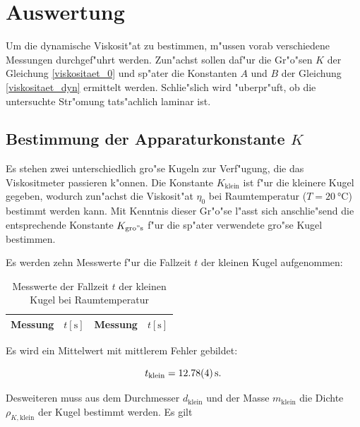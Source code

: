 \clearpage
\newpage
\section{Auswertung}
	\label{sec:auswertung}

	Um die dynamische Viskosit"at zu bestimmen, m"ussen vorab verschiedene Messungen durchgef"uhrt werden.
	Zun"achst sollen daf"ur die Gr"o"sen $K$ der Gleichung \eqref{viskositaet_0} und sp"ater die Konstanten $A$ und $B$ der Gleichung \eqref{viskositaet_dyn} ermittelt werden.
	Schlie"slich wird "uberpr"uft, ob die untersuchte Str"omung tats"achlich laminar ist.

	\subsection{Bestimmung der Apparaturkonstante $K$} %
		\label{sub:bestimmung_k}

		Es stehen zwei unterschiedlich gro"se Kugeln zur Verf"ugung, die das Viskositmeter pas\-sie\-ren k"onnen.
		Die Konstante $K_\mathrm{klein}$ ist f"ur die kleinere Kugel gegeben, wodurch zun"achst die Viskosit"at $\eta_0$ bei Raumtemperatur ($T = \SI{20}{\celsius}$) bestimmt werden kann.
		Mit Kenntnis dieser Gr"o"se l"asst sich anschlie"send die entsprechende Konstante $K_\mathrm{gro"s}$ f"ur die sp"ater ver\-wen\-de\-te gro"se Kugel bestimmen.

		Es werden zehn Messwerte f"ur die Fallzeit $t$ der kleinen Kugel aufgenommen:

		\begin{table}[h!]
			\centering
			\caption{Messwerte der Fallzeit $t$ der kleinen Kugel bei Raumtemperatur}
			\begin{tabular}{|c|c||c|c|}
				\hline
				Messung & $t [\mathrm{s}]$ & Messung & $t [\mathrm{s}]$ \\
				\hline
				\hline
				
				\hline
			\end{tabular}
		\end{table}

		Es wird ein Mittelwert mit mittlerem Fehler gebildet:

		\begin{equation*}
			t_\mathrm{klein} = \SI{12.78 (04)}{\second} .
		\end{equation*}

		Desweiteren muss aus dem Durchmesser $d_\mathrm{klein}$ und der Masse $m_\mathrm{klein}$ die Dichte $\rho_{K,\mathrm{klein}}$ der Kugel bestimmt werden. Es gilt

